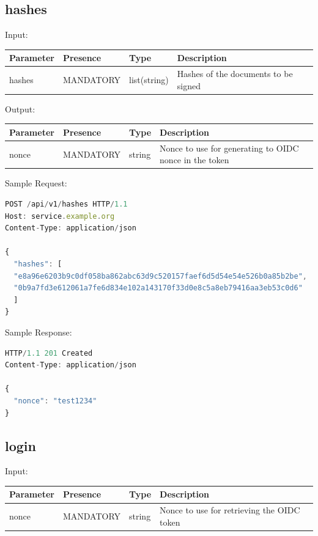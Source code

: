 \subsection{hashes}
Input:

\begin{tabular}{|l|l|l|l|}
	\hline
	Parameter & Presence & Type & Description \\ \hline
	hashes & MANDATORY & list(string) & Hashes of the documents to be signed \\ \hline
\end{tabular}

Output:

\begin{tabular}{|l|l|l|l|}
	\hline
	Parameter & Presence & Type & Description \\ \hline
	nonce & MANDATORY & string & Nonce to use for generating to OIDC nonce in the token \\ \hline
\end{tabular}

Sample Request:
\begin{lstlisting}[caption={hashes request}, captionpos=b, language=JavaScript, label={lst:hashesrequest}]
POST /api/v1/hashes HTTP/1.1
Host: service.example.org
Content-Type: application/json

{
  "hashes": [
  "e8a96e6203b9c0df058ba862abc63d9c520157faef6d5d54e54e526b0a85b2be",
  "0b9a7fd3e612061a7fe6d834e102a143170f33d0e8c5a8eb79416aa3eb53c0d6"
  ]
}
\end{lstlisting}

Sample Response:
\begin{lstlisting}[caption={hashes response}, captionpos=b, language=JavaScript, label={lst:hashesresponse}]
HTTP/1.1 201 Created
Content-Type: application/json

{
  "nonce": "test1234"
}
\end{lstlisting}

\subsection{login}
Input:

\begin{tabular}{|l|l|l|l|}
	\hline
	Parameter & Presence & Type & Description \\ \hline
	nonce & MANDATORY & string & Nonce to use for retrieving the OIDC token \\ \hline
\end{tabular}

